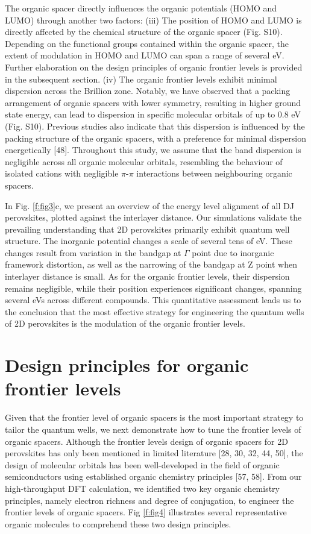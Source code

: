 The organic spacer directly influences the organic potentials (HOMO and LUMO) through another two factors:
(iii) The position of HOMO and LUMO is directly affected by the chemical structure of the organic spacer (Fig. S10). Depending on the functional groups contained within the organic spacer, the extent of modulation in HOMO and LUMO can span a range of several eV. Further elaboration on the design principles of organic frontier levels is provided in the subsequent section. 
(iv) The organic frontier levels exhibit minimal dispersion across the Brillion zone. Notably, we have observed that a packing arrangement of organic spacers with lower symmetry, resulting in higher ground state energy, can lead to dispersion in specific molecular orbitals of up to 0.8 eV (Fig. S10). Previous studies also indicate that this dispersion is influenced by the packing structure of the organic spacers, with a preference for minimal dispersion energetically [48]. Throughout this study, we assume that the band dispersion is negligible across all organic molecular orbitals, resembling the behaviour of isolated cations with negligible $\pi$-$\pi$ interactions between neighbouring organic spacers. 

In Fig. \ref{f:fig3}c, we present an overview of the energy level alignment of all DJ perovskites, plotted against the interlayer distance. Our simulations validate the prevailing understanding that 2D perovskites primarily exhibit quantum well structure. The inorganic potential changes a scale of several tens of eV. These changes result from variation in the bandgap at $\Gamma$ point due to inorganic framework distortion, as well as the narrowing of the bandgap at Z point when interlayer distance is small. As for the organic frontier levels, their dispersion remains negligible, while their position experiences significant changes, spanning several eVs across different compounds. This quantitative assessment leads us to the conclusion that the most effective strategy for engineering the quantum wells of 2D perovskites is the modulation of the organic frontier levels.

\section{Design principles for organic frontier levels}

Given that the frontier level of organic spacers is the most important strategy to tailor the quantum wells, we next demonstrate how to tune the frontier levels of organic spacers. Although the frontier levels design of organic spacers for 2D perovskites has only been mentioned in limited literature [28, 30, 32, 44, 50], the design of molecular orbitals has been well-developed in the field of organic semiconductors using established organic chemistry principles [57, 58]. From our high-throughput DFT calculation, we identified two key organic chemistry principles, namely electron richness and degree of conjugation, to engineer the frontier levels of organic spacers. Fig \ref{f:fig4} illustrates several representative organic molecules to comprehend these two design principles.

